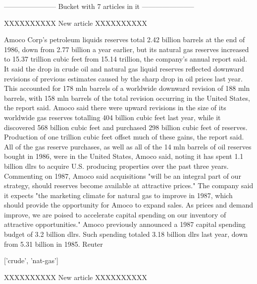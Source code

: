 \documentclass{article}
\begin{document}
\begin{pythonOutput}
['acq']

-----------------------
Bucket with 7 articles in it
-----------------------


XXXXXXXXXX
New article
XXXXXXXXXX

Amoco Corp's petroleum liquids reserves
total 2.42 billion barrels at the end of 1986, down from 2.77
billion a year earlier, but its natural gas reserves increased
to 15.37 trillion cubic feet from 15.14 trillion, the company's
annual report said.
    It said the drop in crude oil and natural gas liquid
reserves reflected downward revisions of previous estimates
caused by the sharp drop in oil prices last year. This
accounted for 178 mln barrels of a worldwide downward revision
of 188 mln barrels, with 158 mln barrels of the total revision
occurring in the United States, the report said.
    Amoco said there were upward revisions in the size of its
worldwide gas reserves totalling 404 billion cubic feet last
year, while it discovered 568 billion cubic feet and purchased
298 billion cubic feet of reserves.
    Production of one trillion cubic feet offset much of these
gains, the report said.
    All of the gas reserve purchases, as well as all of the 14
mln barrels of oil reserves bought in 1986, were in the United
States, Amoco said, noting it has spent 1.1 billion dlrs to
acquire U.S. producing properties over the past three years.
    Commenting on 1987, Amoco said acquisitions "will be an
integral part of our strategy, should reserves become available
at attractive prices."
    The company said it expects "the marketing climate for
natural gas to improve in 1987, which should provide the
opportunity for Amoco to expand sales. As prices and demand
improve, we are poised to accelerate capital spending on our
inventory of attractive opportunities."
    Amoco previously announced a 1987 capital spending budget
of 3.2 billion dlrs. Such spending totaled 3.18 billion dlrs
last year, down from 5.31 billion in 1985.
 Reuter

['crude', 'nat-gas']

XXXXXXXXXX
New article
XXXXXXXXXX


\end{pythonOutput}
\end{document}
